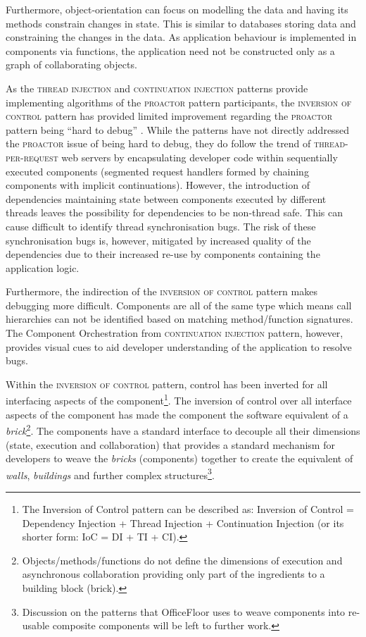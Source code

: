 \documentclass[prodmode]{style/acmlarge}
\begin{document}
Furthermore, object-orientation can focus on modelling the data and having its
methods constrain changes in state.  This is similar to databases storing data
and constraining the changes in the data.  As application behaviour is
implemented in components via functions, the application need not be constructed
only as a graph of collaborating objects.

As the \textsc{thread injection} and \textsc{continuation injection} patterns
provide implementing algorithms of the \textsc{proactor} pattern participants,
the \textsc{inversion of control} pattern has provided limited improvement
regarding the \textsc{proactor} pattern being ``hard to debug'' \cite[p.
7]{proactor}.  While the patterns have not directly addressed the
\textsc{proactor} issue of being hard to debug, they do follow the trend of
\textsc{thread-per-request} web servers \cite{thread-per-request} by
encapsulating developer code within sequentially executed components (segmented
request handlers formed by chaining components with implicit continuations). 
However, the introduction of dependencies maintaining state between components
executed by different threads leaves the possibility for dependencies to be
non-thread safe.  This can cause difficult to identify thread synchronisation
bugs.  The risk of these synchronisation bugs is, however, mitigated by
increased quality of the dependencies due to their increased re-use by
components containing the application logic.

Furthermore, the indirection of the \textsc{inversion of control} pattern makes
debugging more difficult.  Components are all of the same type which means call
hierarchies can not be identified based on matching method/function signatures.
The Component Orchestration from \textsc{continuation injection} pattern,
however, provides visual cues to aid developer understanding of the application
to resolve bugs.

Within the \textsc{inversion of control} pattern, control has been inverted for
all interfacing aspects of the component\footnote{The Inversion of Control
pattern can be described as: Inversion of Control = Dependency Injection +
Thread Injection + Continuation Injection (or its shorter form: IoC = DI + TI +
CI).}.  The inversion of control over all interface aspects of the component has
made the component the software equivalent of a
\textit{brick}\footnote{Objects/methods/functions do not define the dimensions
of execution and asynchronous collaboration providing only part of the
ingredients to a building block (brick).}.  The components have a standard
interface to decouple all their dimensions (state, execution and collaboration)
that provides a standard mechanism for developers to weave the \textit{bricks}
(components) together to create the equivalent of \textit{walls},
\textit{buildings} and further complex structures\footnote{Discussion on the
patterns that OfficeFloor \cite{officefloor} uses to weave components into
re-usable composite components will be left to further work.}.
\end{document}
